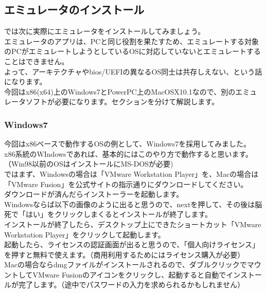 \documentclass[b5paper,9pt,platex,dvipdfmx]{jsarticle}
\begin{document}
\begin{multicols*}{3}
\section{エミュレータのインストール}
では次に実際にエミュレータをインストールしてみましょう。\\
エミュレータのアプリは、PCと同じ役割を果たすため、エミュレートする対象のPCがエミュレートしようとしているOSに対応していないとエミュレートすることはできません。\\
よって、アーキテクチャやbios/UEFIの異なるOS同士は共存しえない、という話になります。\\
今回はx86(x64)上のWindows7とPowerPC上のMacOSX10.1なので、別のエミュレータソフトが必要になります。セクションを分けて解説します。
\subsubsection{Windows7}
今回はx86ベースで動作するOSの例として、Windows7を採用してみました。\\
x86系統のWIndowsであれば、基本的にはこのやり方で動作すると思います。（Win98以前のOSはインストールにMS-DOSが必要)\\
ではまず、Windowsの場合は「VMware Workstation Player」を、Macの場合は「VMware Fusion」を公式サイトの指示通りにダウンロードしてください。\\
ダウンロードが済んだらインストーラーを起動します。\\
Windowsならば以下の画像のように出ると思うので、nextを押して、その後は脳死で「はい」をクリックしまくるとインストールが終了します。\\
インストールが終了したら、デスクトップ上にできたショートカット「VMware Workstation Player」をクリックして起動します。\\
起動したら、ライセンスの認証画面が出ると思うので、「個人向けライセンス」を押すと無料で使えます。（商用利用するためにはライセンス購入が必要）\\
Macの場合ならdmgファイルがインストールされるので、ダブルクリックでマウントしてVMware Fusionのアイコンをクリックし、起動すると自動でインストールが完了します。（途中でパスワードの入力を求められるかもしれません）\\

\end{multicols*}
\end{document}

